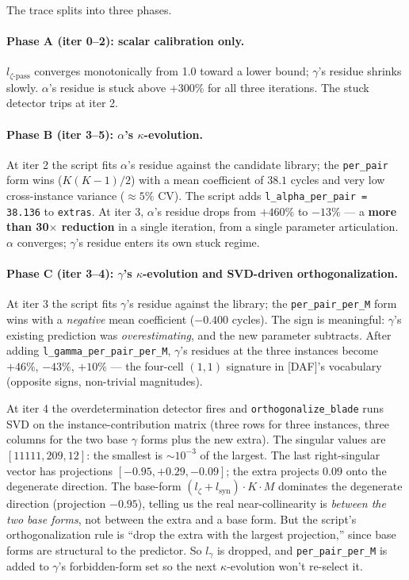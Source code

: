 The trace splits into three phases.

\paragraph{Phase A (iter 0--2): scalar calibration
only.} $l_{\zeta\text{-pass}}$ converges monotonically
from 1.0 toward a lower bound; $\gamma$'s residue
shrinks slowly. $\alpha$'s residue is stuck above
$+300\%$ for all three iterations. The stuck detector
trips at iter 2.

\paragraph{Phase B (iter 3--5): $\alpha$'s
$\kappa$-evolution.} At iter 2 the script fits
$\alpha$'s residue against the candidate library; the
\verb|per_pair| form wins ($K(K-1)/2$) with a mean
coefficient of $38.1$ cycles and very low
cross-instance variance ($\approx 5\%$ CV). The
script adds \verb|l_alpha_per_pair = 38.136| to
\texttt{extras}. At iter 3, $\alpha$'s residue drops
from $+460\%$ to $-13\%$ --- a \textbf{more than 30$\times$
reduction} in a single iteration, from a single
parameter articulation. $\alpha$ converges; $\gamma$'s
residue enters its own stuck regime.

\paragraph{Phase C (iter 3--4): $\gamma$'s
$\kappa$-evolution and SVD-driven orthogonalization.}
At iter 3 the script fits $\gamma$'s residue against
the library; the \verb|per_pair_per_M| form wins with
a \emph{negative} mean coefficient ($-0.400$ cycles).
The sign is meaningful: $\gamma$'s existing prediction
was \emph{overestimating}, and the new parameter
subtracts. After adding
\verb|l_gamma_per_pair_per_M|, $\gamma$'s residues
at the three instances become $+46\%$, $-43\%$, $+10\%$
--- the four-cell $(1,1)$ signature in [DAF]'s
vocabulary (opposite signs, non-trivial magnitudes).

At iter 4 the overdetermination detector fires and
\texttt{orthogonalize\_blade} runs SVD on the
instance-contribution matrix (three rows for three
instances, three columns for the two base $\gamma$
forms plus the new extra). The singular values are
$[11111, 209, 12]$: the smallest is $\sim 10^{-3}$ of
the largest. The last right-singular vector has
projections $[-0.95, +0.29, -0.09]$; the extra
projects $0.09$ onto the degenerate direction. The
base-form $(l_{\zeta} + l_{\mathrm{syn}}) \cdot K \cdot M$
dominates the degenerate direction (projection
$-0.95$), telling us the real near-collinearity is
\emph{between the two base forms}, not between the
extra and a base form. But the script's
orthogonalization rule is ``drop the extra with the
largest projection,'' since base forms are
structural to the predictor. So $l_\gamma$ is
dropped, and \verb|per_pair_per_M| is added to
$\gamma$'s forbidden-form set so the next
$\kappa$-evolution won't re-select it.

